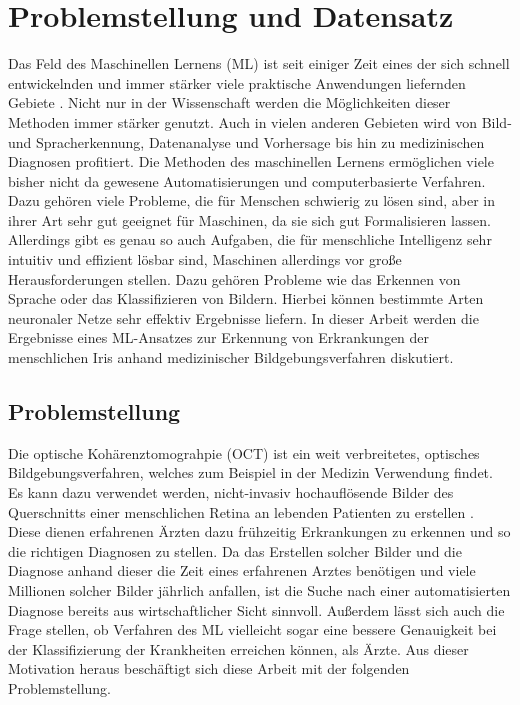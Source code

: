 \chapter{Problemstellung und Datensatz}
\nocite{biblatex, siunitx}%
Das Feld des Maschinellen Lernens (ML) ist seit einiger Zeit eines der sich
schnell entwickelnden und immer stärker viele praktische Anwendungen liefernden
Gebiete \cite{goodfellow}. Nicht nur in der Wissenschaft werden die Möglichkeiten dieser Methoden
immer stärker genutzt. Auch in vielen anderen Gebieten wird von Bild- und
Spracherkennung, Datenanalyse und Vorhersage bis hin zu medizinischen Diagnosen
profitiert. Die Methoden des maschinellen Lernens ermöglichen viele bisher nicht
da gewesene Automatisierungen und computerbasierte Verfahren.
Dazu gehören viele Probleme, die für Menschen schwierig zu lösen sind, aber in
ihrer Art sehr gut geeignet für Maschinen, da sie sich gut Formalisieren lassen.
Allerdings gibt es genau so auch Aufgaben, die für menschliche Intelligenz sehr
intuitiv und effizient lösbar sind, Maschinen allerdings vor große
Herausforderungen stellen. Dazu gehören Probleme wie das Erkennen von Sprache
oder das Klassifizieren von Bildern.
Hierbei können bestimmte Arten neuronaler Netze sehr effektiv Ergebnisse
liefern.
In dieser Arbeit werden die Ergebnisse eines ML-Ansatzes zur Erkennung von
Erkrankungen der menschlichen Iris anhand medizinischer Bildgebungsverfahren
diskutiert.

\section{Problemstellung}

Die optische Kohärenztomograhpie (OCT) ist ein weit verbreitetes, optisches
Bildgebungsverfahren, welches zum Beispiel in der Medizin Verwendung
findet. Es kann dazu verwendet werden, nicht-invasiv hochauflösende
Bilder des Querschnitts einer menschlichen Retina an lebenden Patienten
zu erstellen \cite{paper}.\\
Diese dienen erfahrenen Ärzten dazu frühzeitig Erkrankungen zu erkennen
und so die richtigen Diagnosen zu stellen. Da das Erstellen solcher Bilder
und die Diagnose anhand dieser die Zeit eines erfahrenen Arztes benötigen
und viele Millionen solcher Bilder jährlich anfallen, ist die Suche nach
einer automatisierten Diagnose bereits aus wirtschaftlicher Sicht sinnvoll.
Außerdem lässt sich auch die Frage stellen, ob Verfahren des ML vielleicht
sogar eine bessere Genauigkeit bei der Klassifizierung der Krankheiten erreichen
können, als Ärzte. Aus dieser Motivation heraus beschäftigt sich diese Arbeit  mit der folgenden Problemstellung.
\newline
\noindent{}\\

